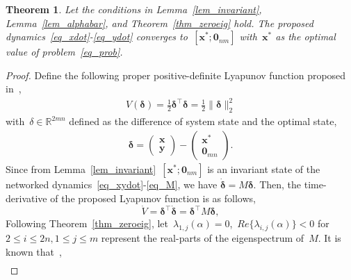 \documentclass[letterpaper, 10pt, conference]{ieeeconf}
\newtheorem{thm}{Theorem}
\def\mb{\mathbf}
\begin{document}
\begin{thm} \label{thm_lyapunov}
Let the conditions in Lemma~\ref{lem_invariant}, Lemma~\ref{lem_alphabar}, and Theorem~\ref{thm_zeroeig} hold.  The proposed dynamics~\eqref{eq_xdot}-\eqref{eq_ydot} converges to~$[\mb{x}^*;\mb{0}_{nm}]$ with~$\mb{x}^*$ as the optimal value of problem~\eqref{eq_prob}. 
\end{thm}
\begin{proof}
Define the following proper positive-definite Lyapunov function proposed in~\cite{mesbahi2010graph},
\begin{eqnarray}
	V(\boldsymbol{\delta}) = \frac{1}{2} \boldsymbol{\delta}^\top \boldsymbol{\delta} =  \frac{1}{2}\lVert\boldsymbol{\delta}\rVert_2^2
\end{eqnarray}
with~$\delta \in \mathbb{R}^{2mn}$ defined as the difference of system state and the optimal state,
\begin{eqnarray}
	\boldsymbol{\delta} = \left(\begin{array}{c} {\mb{x}} \\ {\mb{y}} \end{array} \right)-\left(\begin{array}{c} {\mb{x}^*} \\ {\mb{0}_{mn}} \end{array} \right).
\end{eqnarray}
Since from Lemma~\ref{lem_invariant}~$[\mb{x}^*;\mb{0}_{nm}]$ is an invariant state of the networked dynamics~\eqref{eq_xydot}-\eqref{eq_M}, we have
$\dot{\boldsymbol{\delta}} = M \boldsymbol{\delta}$.
Then, the time-derivative of the proposed Lyapunov function is as follows,
\[\dot{V} = \boldsymbol{\delta}^\top \dot{\boldsymbol{\delta}}=  \boldsymbol{\delta}^\top M \boldsymbol{\delta},
\]
Following Theorem~\ref{thm_zeroeig}, let~${\lambda}_{1,j}(\alpha)=0$,~$Re\{{\lambda}_{i,j}(\alpha)\}<0$ for~$2\leq i\leq2n,1\leq j\leq m$ represent the real-parts of the eigenspectrum of~$M$. 
It is known that~\cite{SensNets:Olfati04},
\begin{eqnarray} \label{eq_Re2}

\end{eqnarray}
\end{proof}
\end{document}
